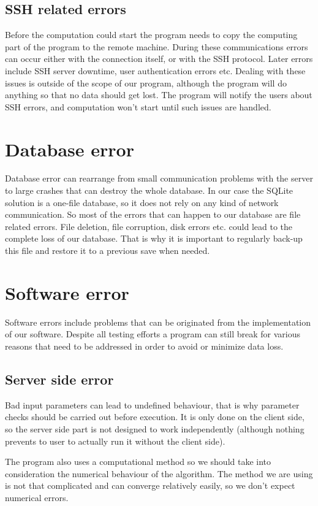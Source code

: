 \documentclass[10pt,a4paper]{report}
\begin{document}
\subsection{SSH related errors}
Before the computation could start the program needs to copy the computing part of the program to the remote machine. During these communications errors can occur either with the connection itself, or with the SSH protocol. Later errors include SSH server downtime, user authentication errors etc. Dealing with these issues is outside of the scope of our program, although the program will do anything so that no data should get lost. The program will notify the users about SSH errors, and computation won't start until such issues are handled.

\section{Database error}
Database error can rearrange from small communication problems with the server to large crashes that can destroy the whole database. In our case the SQLite solution is a one-file database, so it does not rely on any kind of network communication. So most of the errors that can happen to our database are file related errors. File deletion, file corruption, disk errors etc. could lead to the complete loss of our database. That is why it is important to regularly back-up this file and restore it to a previous save when needed.

\section{Software error}
Software errors include problems that can be originated from the implementation of our software. Despite all testing efforts a program can still break for various reasons that need to be addressed in order to avoid or minimize data loss. 

\subsection{Server side error}
Bad input parameters can lead to undefined behaviour, that is why parameter checks should be carried out before execution. It is only done on the client side, so the server side part is not designed to work independently (although nothing prevents to user to actually run it without the client side).

The program also uses a computational method so we should take into consideration the numerical behaviour of the algorithm. The method we are using is not that complicated and can converge relatively easily, so we don't expect numerical errors.
\end{document}
